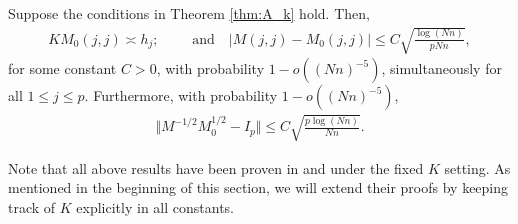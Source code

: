 \documentclass[preprint,11pt]{article}
\newcommand{\zy}[1]{{\color{red}\bf[ZY: #1]}}
\numberwithin{equation}{section}
\begin{document}
\begin{lemma}\label{lem:MM0}
Suppose the conditions in Theorem \ref{thm:A_k} hold. Then,
\begin{align*}
KM_0(j,j) \asymp h_j;\qquad \text{ and} \quad   | M(j,j) - M_0(j,j) | \leq C\sqrt{\frac{\log (Nn)}{pNn}},
\end{align*}
for some constant $C>0$, with probability $1- o((Nn)^{-5})$, simultaneously for all $1\leq j \leq p$. Furthermore, with probability $1- o((Nn)^{-5})$, 
\begin{align} \label{est:MM01/2}
\Big \Vert M^{-1/2} M_0^{1/2} - I_p \Big \Vert  \leq C\sqrt{\frac{p\log (Nn)}{Nn}}.
\end{align}
\end{lemma}

Note that all above results have been proven in \cite{ke2024entry} and \cite{ke2024using} under the fixed $K$ setting. As mentioned in the beginning of this section, we will extend their proofs by keeping track of $K$ explicitly in all constants.
\end{document}
